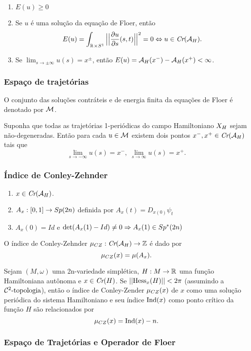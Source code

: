 \documentclass{beamer}
\begin{document}
\begin{footnotesize}
\begin{frame}
		\begin{enumerate}
			\item $E(u)\geq0$
			
			\item Se $u$ é uma solução da equação de Floer, então
			$$
			E(u)=\int_{\mathbb{R}^{} \times S^{1}}\Big|\Big|\frac{\partial u}{\partial s}(s,t)\Big|\Big|^{2} =0 \Leftrightarrow u \in \textit{Cr}(\mathcal{A}_{H}).
			$$
			
			\item Se $\lim_{s\to \pm\infty}u(s)=x^{\pm}$, então $E(u)=\mathcal{A}_{H}(x^{-}) - \mathcal{A}_{H}(x^{+})<\infty$.
		\end{enumerate}
	\end{frame}

	\begin{frame}
		\frametitle{Espaço de trajetórias}
		O conjunto das soluções contráteis e de energia finita da equações de Floer é denotado por $\mathcal{M}$.
		
		\begin{teorema}\label{teorema_limite_solucoes_energia_finita}
			Suponha que todas as trajetórias 1-periódicas do campo Hamiltoniano $X_{H}$ sejam não-degeneradas. Então para cada $u \in \mathcal{M}$ existem dois pontos $x^{-}, x^{+}\in \textit{Cr}(\mathcal{A}_{H})$ tais que
			$$
			\lim_{s\to -\infty}u(s)=x^{-},\; \lim_{s\to \infty}u(s)=x^{+}.
			$$
		\end{teorema}
		
	\end{frame}

	
	\begin{frame}
		
		\frametitle{Índice de Conley-Zehnder}
		\begin{enumerate}
			\item $x\in \textit{Cr}(\mathcal{A}_{H})$.
			
			\item $A_{x}:[0,1] \to Sp(2n)$ definida por $A_{x}(t) = D_{x(0)}\psi_{t}$
			
			\item $A_{x}(0) =Id$ e $\det(A_{x}(1)-Id) \neq 0 \Rightarrow A_{x}(1)\in Sp^{*}(2n)$ 
		\end{enumerate}
		
		O índice de Conley-Zehnder $\mu_{CZ}:\textit{Cr}(\mathcal{A}_{H}) \to \mathbb{Z}$ é dado por 
		$$
		\mu_{CZ}(x) = \mu(A_{x}).
		$$
		
		
		\begin{corolario}
			Sejam $(M,\omega)$ uma 2n-variedade simplética, $H:M\to \mathbb{R}^{}$ uma função Hamiltoniana autônoma e $x \in \textit{Cr}(H)$. Se $||\text{Hess}_{x}(H)||<2\pi$ (assumindo a $\mathcal{C}^{2}\text{-topologia}$), então o índice de Conley-Zender $\mu_{CZ}(x)$ de $x$ como uma solução periódica do sistema Hamiltoniano e seu índice $\text{Ind}(x)$ como ponto crítico da função $H$ são relacionados por
			$$
			\mu_{CZ}(x) = \text{Ind}(x)-n.
			$$
		\end{corolario}
	\end{frame}
		\begin{frame}\frametitle{Espaço de Trajetórias e Operador de Floer}
			

\end{frame}
\end{footnotesize}
\end{document}
